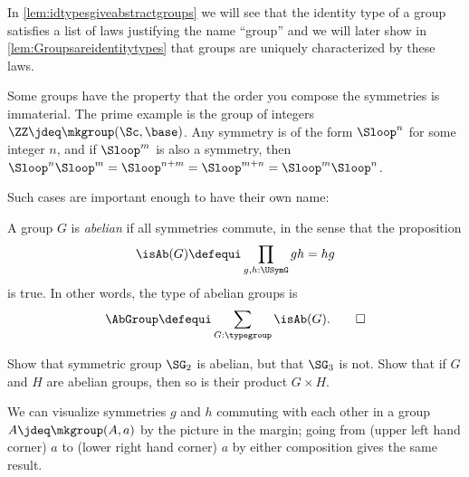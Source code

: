 \begin{remark}
In \cref{lem:idtypesgiveabstractgroups} we will see that the identity type
of a group satisfies a list of laws justifying the name ``group'' and
we will later show in \cref{lem:Groupsareidentitytypes} that groups
are uniquely characterized by these laws.
\end{remark}
Some groups have the property that the order you compose the 
symmetries is immaterial.  The prime example is the group of 
integers $\ZZ\jdeq\mkgroup(\Sc,\base)$.
Any symmetry is of the form $\Sloop^n$ for some integer $n$, 
and if $\Sloop^m$ is also a symmetry, 
then $\Sloop^n\Sloop^m=\Sloop^{n+m}=\Sloop^{m+n}=\Sloop^m\Sloop^n$.

 Such cases are important enough to have their own name:
\begin{definition}\label{def:abgp}
  A group $G$ is \emph{abelian} if all symmetries commute, in the sense that
  the proposition
  \[
    \isAb(G)\defequi\prod_{g,h: \USymG}gh=hg
  \]
  is true.  In other words, the type of abelian groups is
  \[
    \AbGroup \defequi \sum_{G:\typegroup}\isAb(G).\qedhere
  \]
\end{definition}
\begin{xca}\label{exer:first examples}
  Show that symmetric group $\SG_2$ is abelian, but that $\SG_3$ is not.
  Show that if $G$ and $H$ are abelian groups, then so is their product $G\times H$.
\end{xca}
We can visualize symmetries $g$ and $h$ commuting with each
other in a group $A \jdeq\mkgroup(A,a)$ by the picture
in the margin;
going from (upper left hand corner) $a$ to (lower right hand corner) 
$a$ by either composition gives the same result.

